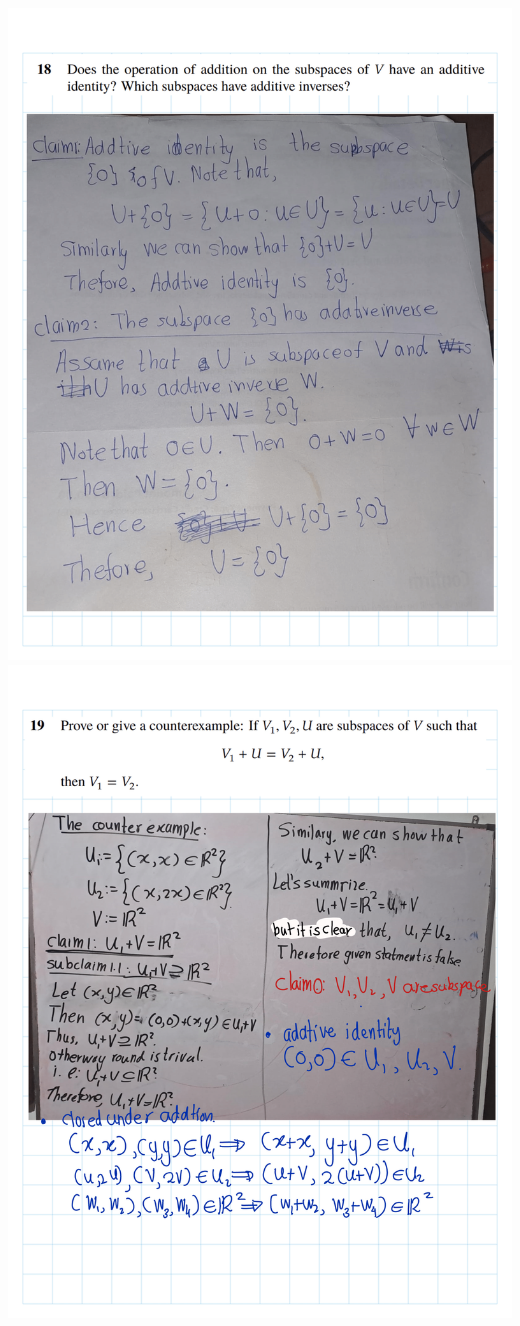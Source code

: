 \documentclass[
]{book}
\theoremstyle{definition}
\theoremstyle{definition}
\theoremstyle{definition}
\theoremstyle{definition}
\theoremstyle{remark}
\begin{document}
\begin{enumerate}
  \includegraphics{fig/Ex1C/Ex/Ex-20.png} \includegraphics{fig/Ex1C/Ex/Ex-21.png}

\end{enumerate}
\end{document}
